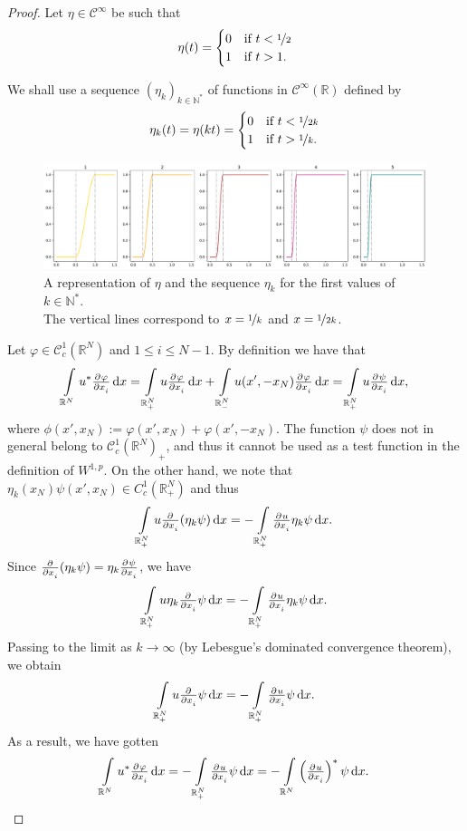 \documentclass[a4paper,doc,11pt]{article}
\newcommand{\R}{\mathbb{R}}
\newcommand{\N}{\mathbb{N}}
\newcommand{\CC}{\mathcal{C}}
\begin{document}
\begin{proof}
    Let \(\eta \in \CC^\infty\) be such that 
    \[
        \eta (t) =
        \begin{cases}
            0   &\text{if } t < \nicefrac 1 2
            \\
            1   & \text{if } t > 1. 
        \end{cases}
    \]

    We shall use a sequence \((\eta_k)_{k\in \N^*}\) of functions in \(\CC^\infty (\R)\) defined by
    \[
        \eta_k (t) = \eta (kt)
        =
        \begin{cases}
            0   &\text{if } t < \nicefrac{1}{2k}
            \\
            1   & \text{if } t > \nicefrac{1}{k}. 
        \end{cases}
    \]
    
    \begin{figure}
    \centering
    \includegraphics[width = \textwidth]{Fig-2_Ext.pdf}
    \caption{A representation of \(\eta\) and the sequence \(\eta_k\) for the first values of \(k \in \N^*\).\\ The vertical lines correspond to \( x = \nicefrac 1 k\) and \(x = \nicefrac{1}{2k}\). }
    \label{fig:2-Ext}
\end{figure}
    
    Let \(\varphi \in \CC^1_c (\R^N)\) and \( 1 \leq i \leq N-1\). By definition we have that
    \[
        \int\limits_{\R^N} u^* \pd{\varphi}{x_i} \dif x = 
        \int\limits_{\R^N_+} u \pd{\varphi}{x_i} \dif x 
        +
        \int\limits_{\R^N_-} u(x',-x_N) \pd{\varphi}{x_i} \dif x 
        =
        \int\limits_{\R^N_+} u \pd{\psi}{x_i} \dif x ,
    \]
    where \(\phi(x', x_N) := \varphi(x', x_N) + \varphi(x', -x_N)\). The function \(\psi\) does not in general belong to \( \CC_c^1 (\R^N)_+\), and thus it cannot be used as a test function in the definition of \( W^{1,p} \). On the other hand, we note that \( \eta_k (x_N) \psi (x', x_N) \in C_c^1 (\R^N_+)\) and thus
    \[
        \int\limits_{\R^N_+} u \pd{ }{x_i} (\eta_k \psi) \dif x 
        =
        -\int\limits_{\R^N_+} \pd{u}{x_i} \eta_k \psi \dif x.
    \]
    Since \( \pd{ }{x_i} (\eta_k \psi) = \eta_k \pd{\psi}{x_i} \), we have
    \[
        \int\limits_{\R^N_+} u \eta_k \pd{ }{x_i} \psi \dif x 
        =
        -\int\limits_{\R^N_+} \pd{u}{x_i} \eta_k \psi \dif x.
    \]
    Passing to the limit as \(k \to \infty\) (by Lebesgue's dominated convergence theorem), we obtain
    \[
        \int\limits_{\R^N_+} u \pd{ }{x_i} \psi \dif x 
        =
        -\int\limits_{\R^N_+} \pd{u}{x_i} \psi \dif x.
    \]
    As a result, we have gotten
    \[
        \int\limits_{\R^N} u^* \pd{\varphi}{x_i} \dif x = 
        -\int\limits_{\R^N_+} \pd{u}{x_i} \psi \dif x =
        -\int\limits_{\R^N} \left(\pd{u}{x_i} \right)^* \psi \dif x.
    \]
    

\end{proof}
\end{document}

